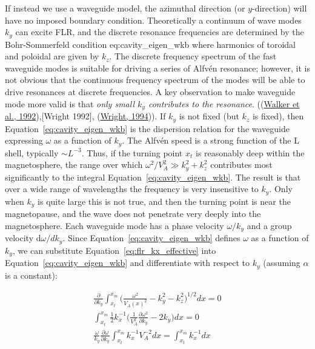 \documentclass[
  notoc %
]{tufte-book}
\begin{document}
If instead we use a waveguide model, the azimuthal direction (or
\(y\)-direction) will have no imposed boundary condition. Theoretically
a continuum of wave modes \(k_y\) can excite FLR, and the discrete
resonance frequencies are determined by the Bohr-Sommerfeld condition
eq:cavity\_eigen\_wkb where harmonics of toroidal and poloidal are given
by \(k_z\). The discrete frequency spectrum of the fast waveguide modes
is suitable for driving a series of Alfvén resonance; however, it is not
obvious that the continuous frequency spectrum of the modes will be able
to drive resonances at discrete frequencies. A key observation to make
waveguide mode more valid is that \emph{only small \(k_y\) contributes
to the resonance}. ((\protect\hyperlink{ref-walker1992spatial}{Walker et
al., 1992}),{[}Wright 1992{]},
(\protect\hyperlink{ref-wright1994}{Wright, 1994})). If \(k_y\) is not
fixed (but \(k_z\) is fixed), then Equation~\ref{eq:cavity_eigen_wkb} is
the dispersion relation for the waveguide expressing \(\omega\) as a
function of \(k_y\). The Alfvén speed is a strong function of the L
shell, typically \(\sim L^{-3}\). Thus, if the turning point \(x_t\) is
reasonably deep within the magnetosphere, the range over which
\(\omega^2/V_A^2 \gg k_y^2 + k_z^2\) contributes most significantly to
the integral Equation~\ref{eq:cavity_eigen_wkb}. The result is that over
a wide range of wavelengths the frequency is very insensitive to
\(k_y\). Only when \(k_y\) is quite large this is not true, and then the
turning point is near the magnetopause, and the wave does not penetrate
very deeply into the magnetosphere. Each waveguide mode has a phase
velocity \(\omega/k_y\) and a group velocity \(\mathrm{d}\omega/dk_y\).
Since Equation~\ref{eq:cavity_eigen_wkb} defines \(\omega\) as a
function of \(k_y\), we can substitute
Equation~\ref{eq:flr_kx_effective} into
Equation~\ref{eq:cavity_eigen_wkb} and differentiate with respect to
\(k_y\) (assuming \(\alpha\) is a constant):

\[
\begin{aligned}
\frac{\partial}{\partial k_y}\int_{x_t}^{x_m}\Big(\frac{\omega^2}{V_A(x)^2}-k_y^2 - k_z^2\Big)^{1/2}dx = 0 \\
\int_{x_t}^{x_m}\frac{1}{2}k_x^{-1}\Big( \frac{1}{V_A^2}\frac{\partial \omega^2}{\partial k_y} - 2k_y \Big)dx = 0 \\
\frac{\omega}{k_y}\frac{\partial\omega}{\partial k_y}\int_{x_t}^{x_m}k_x^{-1}V_A^{-2}dx = \int_{x_t}^{x_m} k_x^{-1}dx
\end{aligned}
\]
\end{document}
